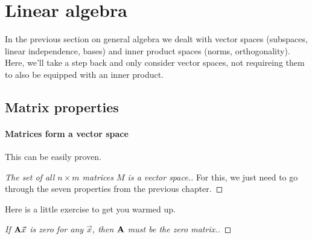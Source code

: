 \section{Linear algebra}

In the previous section on general algebra we dealt with vector spaces (subspaces, linear independence, bases) and inner product spaces (norms, orthogonality). Here, we'll take a step back and only consider vector spaces, not requireing them to also be equipped with an inner product. 


\subsection{Matrix properties}

\paragraph{Matrices form a vector space} This can be easily proven.

\begin{proof}[The set of all $n \times m$ matrices $M$ is a vector space.] For this, we just need to go through the seven properties from the previous chapter. 

    
    
\end{proof}


Here is a little exercise to get you warmed up. 

\begin{proof}[If $\mathbf{A}\vec{x}$ is zero for any $\vec{x}$, then $\mathbf{A}$ must be the zero matrix.]


\end{proof}


